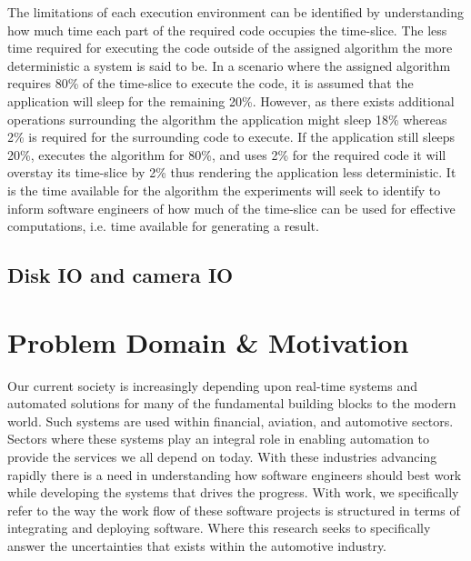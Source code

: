 The limitations of each execution environment can be identified by understanding how much time each part of the required code occupies the time-slice. The less time required for executing the code outside of the assigned algorithm the more deterministic a system is said to be. In a scenario where the assigned algorithm requires 80\% of the time-slice to execute the code, it is assumed that the application will sleep for the remaining 20\%. However, as there exists additional operations surrounding the algorithm the application might sleep 18\% whereas 2\% is required for the surrounding code to execute. If the application still sleeps 20\%, executes the algorithm for 80\%, and uses 2\% for the required code it will overstay its time-slice by 2\% thus rendering the application less deterministic. It is the time available for the algorithm the experiments will seek to identify to inform software engineers of how much of the time-slice can be used for effective computations, i.e. time available for generating a result.



\subsection{Disk IO and camera IO}



\section{Problem Domain \& Motivation}
Our current society is increasingly depending upon real-time systems and automated solutions for many of the fundamental building blocks to the modern world. Such systems are used within financial, aviation, and automotive sectors. Sectors where these systems play an integral role in enabling automation to provide the services we all depend on today. With these industries advancing rapidly there is a need in understanding how software engineers should best work while developing the systems that drives the progress. With work, we specifically refer to the way the work flow of these software projects is structured in terms of integrating and deploying software. Where this research seeks to specifically answer the uncertainties that exists within the automotive industry. \\

